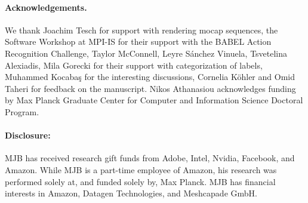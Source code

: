 \documentclass[final]{cvpr}
\begin{document}
\paragraph{Acknowledgements.} We thank Joachim Tesch for support with rendering mocap sequences, the Software Workshop at MPI-IS for their support with the BABEL Action Recognition Challenge, Taylor McConnell, Leyre Sánchez Vinuela, Tsvetelina Alexiadis, Mila Gorecki for their support with categorization of labels, Muhammed Kocabaş for the interesting discussions, Cornelia Köhler and Omid Taheri for feedback on the manuscript. Nikos Athanasiou acknowledges funding by Max Planck Graduate Center for Computer and Information Science Doctoral Program.

\paragraph{Disclosure:} 
MJB has received research gift funds from Adobe, Intel, Nvidia, Facebook, and Amazon. While MJB is a part-time employee of Amazon, his research was performed solely at, and funded solely by, Max Planck. MJB has financial interests in Amazon, Datagen Technologies, and Meshcapade GmbH.
 
{\small

\balance

}
\end{document}
